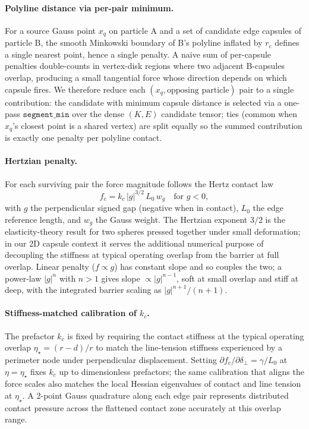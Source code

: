 \documentclass[aps,pre,twocolumn,floatfix,longbibliography]{revtex4-2}
\begin{document}
\paragraph{Polyline distance via per-pair minimum.}
For a source Gauss point $x_q$ on particle A and a set of candidate edge
capsules of particle B, the smooth Minkowski boundary of B's polyline
inflated by $r_c$ defines a single nearest point, hence a single penalty.
A naive sum of per-capsule penalties double-counts in vertex-disk regions
where two adjacent B-capsules overlap, producing a small tangential force
whose direction depends on which capsule fires.  We therefore reduce each
$(x_q, \text{opposing particle})$ pair to a single contribution: the
candidate with minimum capsule distance is selected via a one-pass
$\texttt{segment\_min}$ over the dense $(K, E)$ candidate tensor; ties
(common when $x_q$'s closest point is a shared vertex) are split equally
so the summed contribution is exactly one penalty per polyline contact.

\paragraph{Hertzian penalty.}
For each surviving pair the force magnitude follows the Hertz contact law
\begin{equation}
  f_c = k_c\,|g|^{3/2}\,L_0\,w_g \quad \text{for } g < 0,
\label{eq:hertz}
\end{equation}
with $g$ the perpendicular signed gap (negative when in contact), $L_0$ the
edge reference length, and $w_g$ the Gauss weight.  The Hertzian exponent
$3/2$ is the elasticity-theory result for two spheres pressed together
under small deformation; in our 2D capsule context it serves the additional
numerical purpose of decoupling the stiffness at typical operating overlap
from the barrier at full overlap.  Linear penalty ($f \propto g$) has
constant slope and so couples the two; a power-law $|g|^n$ with $n>1$ gives
slope $\propto |g|^{n-1}$, soft at small overlap and stiff at deep, with
the integrated barrier scaling as $|g|^{n+1}/(n+1)$.

\paragraph{Stiffness-matched calibration of $k_c$.}
The prefactor $k_c$ is fixed by requiring the contact stiffness at the
typical operating overlap $\eta_\star = (r-d)/r$ to match the line-tension
stiffness experienced by a perimeter node under perpendicular displacement.
Setting $\partial f_c/\partial \delta_\perp = \gamma/L_0$ at $\eta = \eta_\star$
fixes $k_c$ up to dimensionless prefactors; the same calibration that aligns
the force scales also matches the local Hessian eigenvalues of contact and
line tension at $\eta_\star$.  A 2-point Gauss quadrature along each edge
pair represents distributed contact pressure across the flattened contact
zone accurately at this overlap range.
\end{document}
